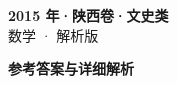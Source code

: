 \documentclass[zihao=-4, a4paper]{ctexart}
\begin{document}
\begin{center}
  {\Large\bfseries 2015 年·陕西卷·文史类}\\[4pt]
  {\large 数学 · 解析版}
\end{center}
\medskip
{}

\clearpage
{}
\begin{center}{\Large\bfseries 参考答案与详细解析}\end{center}
\medskip

\end{document}
